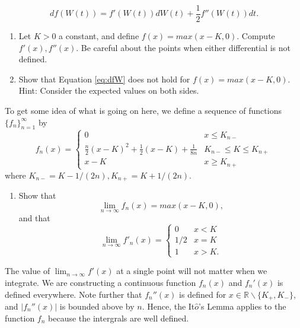 \documentclass{article}
\begin{document}
\begin{enumerate}
\begin{equation} 
df(W(t)) = f'(W(t))dW(t)+\frac12f''(W(t))dt.
\label{eq:dfW}
\end{equation}
\begin{enumerate}
\item Let $K>0$ a constant, and define $f(x)=max(x-K,0)$. Compute $f'(x), f''(x)$. Be careful about the points when either differential is not defined.
\item Show that Equation \ref{eq:dfW} does not hold for $f(x)=max(x-K,0)$. Hint: Consider the expected values on both sides.
\end{enumerate}
To get some idea of what is going on here, we define a sequence of functions $\{f_n\}_{n=1}^{\infty}$ by
\[
f_n(x) = \begin{cases}
0 & x\leq K_{n-} \\
\frac n2(x-K)^2 + \frac12(x-K) +\frac1{8n} & K_{n-}\leq K\leq K_{n+}\\
x-K & x\geq K_{n+}
\end{cases}
\]
where $K_{n-}=K-1/({2n}), K_{n+}=K+1/({2n})$.
\begin{enumerate}
\addtocounter{enumii}{2}
\item Show that
\[
\lim_{n\to\infty} f_n(x) = max(x-K,0),
\]
and that 
\[
\lim_{n\to\infty} f'_n(x) = \begin{cases} 0 & x< K \\
1/2 & x=K \\
1 & x> K. \end{cases}
\]
\end{enumerate}
The value of $\lim_{n\to\infty}f'(x)$ at a single point will not matter when we integrate. We are constructing a continuous function $f_n(x)$ and $f_n'(x)$ is defined everywhere. Note further that $f_n''(x)$ is defined for $x\in\mathbb R\backslash\{K_+,K_-\}$, and $|f_n''(x)|$ is bounded above by $n$. Hence, the It$\hat o$'s Lemma applies to the function $f_n$ because the intergrals are well defined. 
\end{enumerate}
\end{document}
